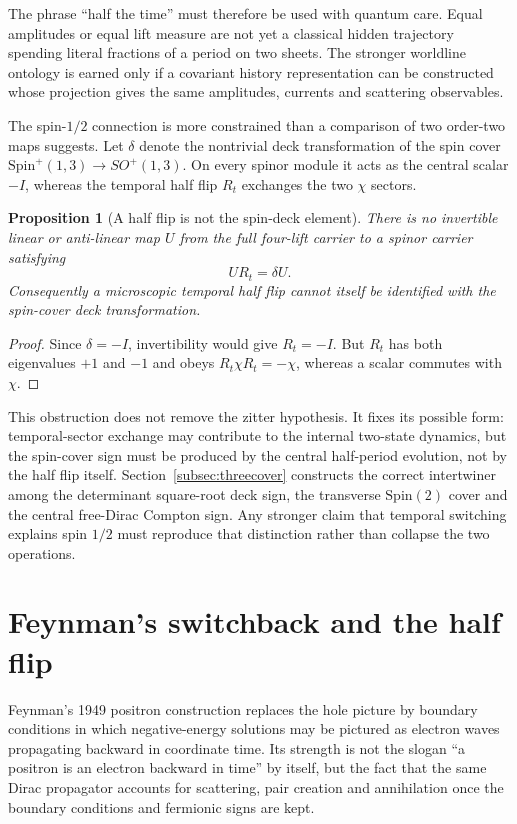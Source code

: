 \documentclass[11pt]{article}
\newtheorem{proposition}[theorem]{Proposition}
\theoremstyle{definition}\newtheorem{definition}[theorem]{Definition}
\theoremstyle{remark}\newtheorem{remark}[theorem]{Remark}\newtheorem{conjecture}[theorem]{Conjecture}
\begin{document}
The phrase ``half the time'' must therefore be used with quantum care. Equal amplitudes or equal lift measure are not yet a classical hidden trajectory spending literal fractions of a period on two sheets. The stronger worldline ontology is earned only if a covariant history representation can be constructed whose projection gives the same amplitudes, currents and scattering observables.

The spin-$1/2$ connection is more constrained than a comparison of two order-two maps suggests. Let $\delta$ denote the nontrivial deck transformation of the spin cover $\mathrm{Spin}^+(1,3)\to SO^+(1,3)$. On every spinor module it acts as the central scalar $-I$, whereas the temporal half flip $R_t$ exchanges the two $\chi$ sectors.

\begin{proposition}[A half flip is not the spin-deck element]\label{prop:halfnotdeck}
There is no invertible linear or anti-linear map $U$ from the full four-lift carrier to a spinor carrier satisfying
\begin{equation}
 U R_t=\delta U.
\end{equation}
Consequently a microscopic temporal half flip cannot itself be identified with the spin-cover deck transformation.
\end{proposition}
\begin{proof}
Since $\delta=-I$, invertibility would give $R_t=-I$. But $R_t$ has both eigenvalues $+1$ and $-1$ and obeys $R_t\chi R_t=-\chi$, whereas a scalar commutes with $\chi$.
\end{proof}

This obstruction does not remove the zitter hypothesis. It fixes its possible form: temporal-sector exchange may contribute to the internal two-state dynamics, but the spin-cover sign must be produced by the central half-period evolution, not by the half flip itself. Section~\ref{subsec:threecover} constructs the correct intertwiner among the determinant square-root deck sign, the transverse $\mathrm{Spin}(2)$ cover and the central free-Dirac Compton sign. Any stronger claim that temporal switching explains spin $1/2$ must reproduce that distinction rather than collapse the two operations.

\section{Feynman's switchback and the half flip}
Feynman's 1949 positron construction replaces the hole picture by boundary conditions in which negative-energy solutions may be pictured as electron waves propagating backward in coordinate time. Its strength is not the slogan ``a positron is an electron backward in time'' by itself, but the fact that the same Dirac propagator accounts for scattering, pair creation and annihilation once the boundary conditions and fermionic signs are kept.
\end{document}
